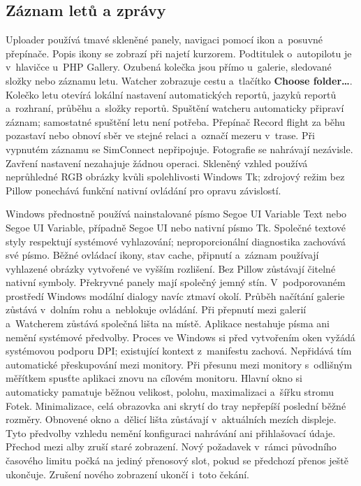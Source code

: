 \documentclass[11pt,a4paper]{article}
\newcommand{\ui}[1]{\textbf{#1}}
\begin{document}
\subsection{Záznam letů a zprávy}

Uploader používá tmavé skleněné panely, navigaci pomocí ikon a~posuvné
přepínače. Popis ikony se zobrazí při najetí kurzorem.
Podtitulek o~autopilotu je v~hlavičce u~PHP Gallery. Ozubená kolečka jsou
přímo u~galerie, sledované složky nebo záznamu letu. Watcher zobrazuje cestu
a~tlačítko \ui{Choose folder…}. Kolečko letu otevírá lokální nastavení
automatických reportů, jazyků reportů a~rozhraní, průběhu a~složky reportů.
Spuštění watcheru automaticky připraví záznam; samostatné spuštění letu není
potřeba. Přepínač Record flight za běhu pozastaví nebo obnoví sběr ve stejné
relaci a~označí mezeru v~trase. Při vypnutém záznamu se SimConnect
nepřipojuje. Fotografie se nahrávají nezávisle. Zavření nastavení nezahajuje
žádnou operaci. Skleněný vzhled používá neprůhledné RGB obrázky kvůli
spolehlivosti Windows Tk; zdrojový režim bez Pillow ponechává funkční
nativní ovládání pro opravu závislostí.

Windows přednostně používá nainstalované písmo Segoe UI Variable Text nebo
Segoe UI Variable, případně Segoe UI nebo nativní písmo Tk. Společné textové styly respektují
systémové vyhlazování; neproporcionální diagnostika zachovává své písmo.
Běžné ovládací ikony, stav cache, připnutí a~záznam používají vyhlazené
obrázky vytvořené ve vyšším rozlišení. Bez Pillow zůstávají čitelné nativní
symboly. Překryvné panely mají společný jemný stín. V~podporovaném prostředí
Windows modální dialogy navíc ztmaví okolí. Průběh načítání galerie zůstává
v~dolním rohu a~neblokuje ovládání. Při přepnutí mezi galerií a~Watcherem
zůstává společná lišta na místě. Aplikace nestahuje písma ani
nemění systémové předvolby.
Proces ve Windows si před vytvořením oken vyžádá systémovou podporu DPI;
existující kontext z~manifestu zachová. Nepřidává tím automatické
přeskupování mezi monitory. Při přesunu mezi monitory s~odlišným měřítkem
spusťte aplikaci znovu na cílovém monitoru.
Hlavní okno si automaticky pamatuje běžnou velikost, polohu, maximalizaci
a~šířku stromu Fotek. Minimalizace, celá obrazovka ani skrytí do tray
nepřepíší poslední běžné rozměry. Obnovené okno a~dělicí lišta zůstávají
v~aktuálních mezích displeje. Tyto předvolby vzhledu nemění konfiguraci
nahrávání ani přihlašovací údaje.
Přechod mezi alby zruší staré zobrazení. Nový požadavek v~rámci původního
časového limitu počká na jediný přenosový slot, pokud se předchozí přenos
ještě ukončuje. Zrušení nového zobrazení ukončí i~toto čekání.
\end{document}
